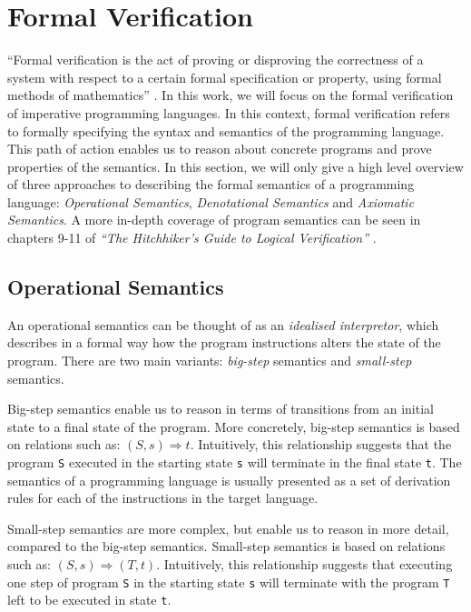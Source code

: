 \documentclass[runningheads]{llncs}
\newcommand{\cc}{\lstinline[mathescape]}
\begin{document}
\section{Formal Verification}

``Formal verification is the act of proving or disproving the correctness of a
system with respect to a certain formal specification or property, using formal
methods of mathematics'' \cite{formalver}. In this work, we will focus on the
formal verification of imperative programming languages. In this context,
formal verification refers to formally specifying the syntax and semantics of
the programming language. This path of action enables us to reason about
concrete programs and prove properties of the semantics. In this section, we
will only give a high level overview of three approaches to describing the
formal semantics of a programming language: \emph{Operational Semantics},
\emph{Denotational Semantics} and \emph{Axiomatic Semantics}. A more in-depth
coverage of program semantics can be seen in chapters 9-11 of \emph{``The
Hitchhiker’s Guide to Logical Verification''} \cite{hitchhiker}.

\subsection{Operational Semantics}

An operational semantics can be thought of as an \emph{idealised interpretor},
which describes in a formal way how the program instructions alters the state
of the program. There are two main variants: \emph{big-step} semantics and
\emph{small-step} semantics.

Big-step semantics enable us to reason in terms of transitions from an initial
state to a final state of the program. More concretely, big-step semantics is
based on relations such as: $(S,s) \Rightarrow t$. Intuitively, this
relationship suggests that the program \cc{S} executed in the starting state
\cc{s} will terminate in the final state \cc{t}. The semantics of a programming
language is usually presented as a set of derivation rules for each of the
instructions in the target language.

Small-step semantics are more complex, but enable us to reason in more detail,
compared to the big-step semantics. Small-step semantics is based on relations
such as: $(S, s) \Rightarrow (T, t)$. Intuitively, this relationship suggests
that executing one step of program \cc{S} in the starting state \cc{s} will
terminate with the program \cc{T} left to be executed in state \cc{t}.
\end{document}
